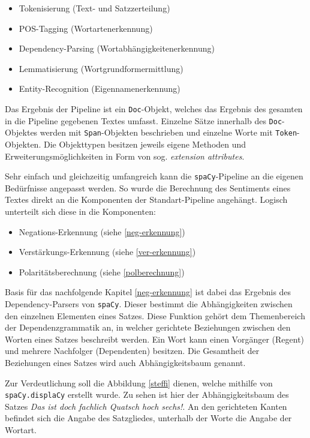 \begin{itemize}
\item Tokenisierung (Text- und Satzzerteilung)
\item POS-Tagging (Wortartenerkennung)
\item Dependency-Parsing (Wortabhängigkeitenerkennung)
\item Lemmatisierung (Wortgrundformermittlung)
\item Entity-Recognition (Eigennamenerkennung)
\end{itemize}

Das Ergebnis der Pipeline ist ein \texttt{Doc}-Objekt, welches das Ergebnis des gesamten in die Pipeline gegebenen Textes umfasst. 
Einzelne Sätze innerhalb des \texttt{Doc}-Objektes werden mit \texttt{Span}-Objekten beschrieben und einzelne Worte mit \texttt{Token}-Objekten. 
Die Objekttypen besitzen jeweils eigene Methoden und Erweiterungsmöglichkeiten in Form von sog. \textit{extension attributes}. 

Sehr einfach und gleichzeitig umfangreich kann die \texttt{spaCy}-Pipeline an die eigenen Bedürfnisse angepasst werden. 
So wurde die Berechnung des Sentiments eines Textes direkt an die Komponenten der Standart-Pipeline angehängt. 
Logisch unterteilt sich diese in die Komponenten:

\begin{itemize}
\item Negations-Erkennung (siehe \ref{neg-erkennung})
\item Verstärkungs-Erkennung (siehe \ref{ver-erkennung})
\item Polaritätsberechnung (siehe \ref{polberechnung})
\end{itemize}

Basis für das nachfolgende Kapitel \ref{neg-erkennung} ist dabei das Ergebnis des Dependency-Parsers von \texttt{spaCy}. 
Dieser bestimmt die Abhängigkeiten zwischen den einzelnen Elementen eines Satzes. 
Diese Funktion gehört dem Themenbereich der Dependenzgrammatik an, in welcher gerichtete Beziehungen zwischen den Worten eines Satzes beschreibt werden. 
Ein Wort kann einen Vorgänger (Regent) und mehrere Nachfolger (Dependenten) besitzen. 
Die Gesamtheit der Beziehungen eines Satzes wird auch Abhängigkeitsbaum genannt. 

Zur Verdeutlichung soll die Abbildung \ref{steffi} dienen, welche mithilfe von \texttt{spaCy.displaCy} erstellt wurde. 
Zu sehen ist hier der Abhängigkeitsbaum des Satzes \textit{\glqq Das ist doch fachlich Quatsch hoch sechs!\grqq}. 
An den gerichteten Kanten befindet sich die Angabe des Satzgliedes, unterhalb der Worte die Angabe der Wortart. 

